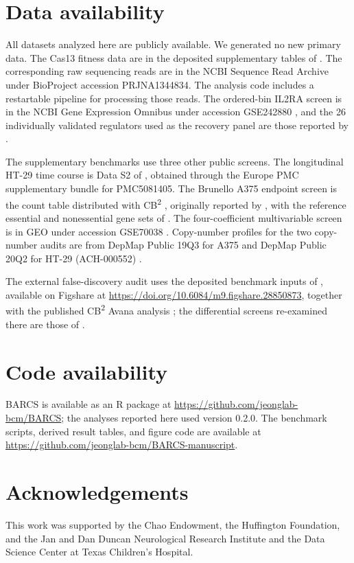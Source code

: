 
\section*{Data availability}
All datasets analyzed here are publicly available.  We generated no new
primary data.  The Cas13 fitness data are in the deposited supplementary tables of
\citet{liang2026lncrna}.  The corresponding raw sequencing reads are in the
NCBI Sequence Read Archive under BioProject accession PRJNA1344834.  The
analysis code includes a restartable pipeline for processing those reads.  The ordered-bin IL2RA screen is in the NCBI
Gene Expression Omnibus under accession GSE242880
\citep{pimentel2024waterbear}, and the 26 individually validated regulators
used as the recovery panel are those reported by \citet{freimer2022il2ra}.

The supplementary benchmarks use three other public screens.  The longitudinal
HT-29 time course is Data S2 of \citet{tzelepis2016dropout}, obtained through
the Europe PMC supplementary bundle for PMC5081405.  The Brunello A375
endpoint screen is the count table distributed with CB\textsuperscript{2}
\citep{jeong2019beta}, originally reported by \citet{sanson2018optimized},
with the reference essential and nonessential gene sets of
\citet{hart2017evaluation}.  The four-coefficient multivariable screen is in
GEO under accession GSE70038 \citep{toledo2015pkmyt1}. Copy-number profiles
for the two copy-number audits are from DepMap Public 19Q3 for A375
\citep{depmap19q3} and DepMap Public 20Q2 for HT-29 (ACH-000552)
\citep{depmap20q2}.

The external false-discovery audit uses the deposited benchmark inputs of
\citet{dempster2025fdrdata}, available on Figshare at
\url{https://doi.org/10.6084/m9.figshare.28850873}, together with the
published CB\textsuperscript{2} Avana analysis \citep{jeong2019beta}; the
differential screens re-examined there are those of
\citet{deweirdt2020isogenic}.

\section*{Code availability}
BARCS is available as an R package at
\url{https://github.com/jeonglab-bcm/BARCS}; the analyses reported here used
version 0.2.0.  The benchmark scripts, derived result tables, and figure code
are available at \url{https://github.com/jeonglab-bcm/BARCS-manuscript}.

\section*{Acknowledgements}

This work was supported by the Chao Endowment, the Huffington Foundation, and
the Jan and Dan Duncan Neurological Research Institute and the Data Science
Center at Texas Children's Hospital.
